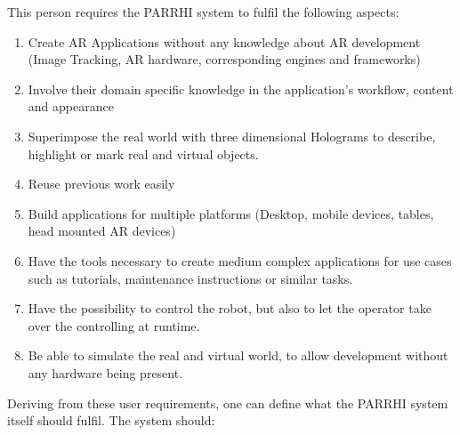 This person requires the PARRHI system to fulfil the following aspects:
\begin{enumerate}
	\setlength\itemsep{-1em}
	\item Create AR Applications without any knowledge about AR development (Image Tracking, AR hardware, corresponding engines and frameworks)
	\item Involve their domain specific knowledge in the application's workflow, content and appearance
	\item Superimpose the real world with three dimensional Holograms to describe, highlight or mark real and virtual objects.
	\item Reuse previous work easily
	\item Build applications for multiple platforms (Desktop, mobile devices, tables, head mounted AR devices) 
	\item Have the tools necessary to create medium complex applications for use cases such as tutorials, maintenance instructions or similar tasks.
	\item Have the possibility to control the robot, but also to let the operator take over the controlling at runtime.
	\item Be able to simulate the real and virtual world, to allow development without any hardware being present. 
\end{enumerate}

Deriving from these user requirements, one can define what the PARRHI system itself should fulfil. The system should:

